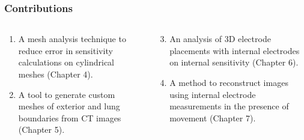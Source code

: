 \documentclass[10pt,    %
    english,            %
    xcolor=table,       %
    envcountsect,        %
    aspectratio=1610
]{beamer}
\begin{document}
\begin{frame}
	\frametitle{Contributions}    
	\begin{columns}[c]
		\begin{column}{0.5\textwidth}
			\begin{enumerate}
				\item A mesh analysis technique to reduce error in sensitivity calculations on 
				cylindrical meshes (\alert{Chapter 4}). \\ \vspace{4mm}
				\item A tool to generate custom meshes of exterior and lung boundaries from CT images
				(\alert{Chapter 5}).
			\end{enumerate}
		\end{column}
		\begin{column}{0.5\textwidth}
			\begin{enumerate}
				\setcounter{enumi}{2}
				\item An analysis of 3D electrode placements with internal electrodes on internal 
				sensitivity (\alert{Chapter 6}). \\ \vspace{4mm}
				\item A method to reconstruct images using internal electrode measurements in the
				presence of movement (\alert{Chapter 7}).
			\end{enumerate}
		\end{column}
	\end{columns}
\end{frame}
\end{document}
